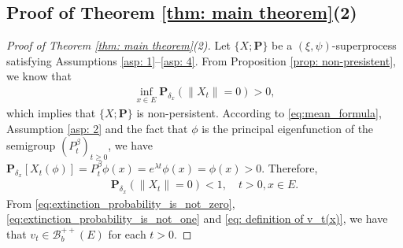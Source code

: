 \documentclass[12pt,a4paper]{amsart}
\theoremstyle{definition}
\numberwithin{equation}{section}
\begin{document}
\subsection{Proof of Theorem \ref{thm: main theorem}(2)}
\label{sec: proof of result 2}
\begin{proof}
  [Proof of Theorem \ref{thm: main theorem}(2)]
  Let $\{X; \mathbf P\}$ be a $(\xi, \psi)$-superprocess satisfying
  Assumptions \ref{asp: 1}--\ref{asp: 4}.
  From Proposition \ref{prop: non-presistent}, we know that 
  \begin{align}
    \label{eq:extinction_probability_is_not_zero}
    \inf_{x\in E} \mathbf P_{\delta_x}(\|X_t\| = 0)
    > 0,
  \end{align}
  which implies that $\{X; \mathbf P\}$ is non-persistent.
  According to \eqref{eq:mean_formula}, Assumption \ref{asp: 2} and the fact that $\phi$ is the principal eigenfunction of the semigroup $(P_t^\beta)_{t\geq 0}$, we have $\mathbf P_{\delta_x}[X_t(\phi)] = P_t^\beta \phi(x) = e^{\lambda t} \phi(x)= \phi(x)>0$.
  Therefore,
  \begin{align}
    \label{eq:extinction_probability_is_not_one}
    \mathbf P_{\delta_x}(\|X_t\|= 0)<1,
    \quad t>0, x \in E.
  \end{align}
  From \eqref{eq:extinction_probability_is_not_zero}, \eqref{eq:extinction_probability_is_not_one} and \eqref{eq: definition of v_t(x)}, we have that $v_t \in \mathscr B^{++}_b(E)$ for each $t > 0$.


\end{proof}
\end{document}

